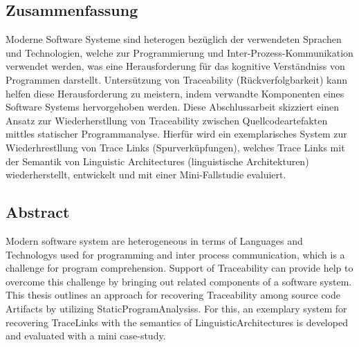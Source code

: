 
\subsection*{Zusammenfassung}
Moderne Software Systeme sind heterogen bezüglich der verwendeten Sprachen und Technologien, welche zur Programmierung und Inter\--Prozess\--Kom\-mu\-ni\-ka\-ti\-on verwendet werden, was eine Herausforderung für das kognitive Verständniss von Programmen darstellt.
Untersützung von \Gls{Traceability} (Rück\-ver\-folg\-bar\-keit) kann helfen diese Herausforderung zu meistern, indem verwandte Komponenten eines Software Systems hervorgehoben werden.
Diese Abschlussarbeit skiz\-ziert einen Ansatz zur Wiederherstllung von \Gls{Traceability} zwischen Quellcodeartefakten mittles statischer Programmanalyse.
Hierfür wird ein exemplarisches System zur Wiederhrestllung von Trace Links (Spurverküpfungen), welches Trace Links mit der Semantik von Linguistic Architectures (linguistische Architekturen) wiederherstellt, entwickelt und mit einer Mini-Fallstudie evaluiert.

\subsection*{Abstract}
Modern software system are heterogeneous in terms of \glspl{Language} and \glspl{Technology} used for programming and inter process communication, which is a challenge for program comprehension.
Support of \gls{Traceability} can provide help to overcome this challenge by bringing out related components of a software system.
This thesis outlines an approach for recovering \gls{Traceability} among source code \glspl{Artifact} by utilizing \glspl{StaticProgramAnalysis}.
For this, an exemplary system for recovering \glspl{TraceLink} with the semantics of \glspl{LinguisticArchitecture} is developed and evaluated with a mini case-study.


